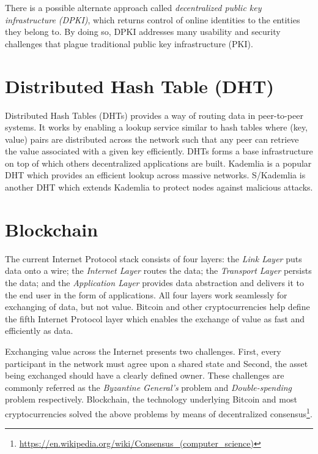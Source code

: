 	There is a possible alternate approach called \textit{decentralized public key infrastructure (DPKI)}, which returns control of online identities to the entities they belong to. By doing so, DPKI addresses many usability and security challenges that plague traditional public key infrastructure (PKI)\cite{allen2015decentralized}.
	
\section{Distributed Hash Table (DHT)}
	Distributed Hash Tables (DHTs)\cite{galuba2009distributed} provides a way of routing data in peer-to-peer systems. It works by enabling a lookup service similar to hash tables where (key, value) pairs are distributed across the network such that any peer can retrieve the value associated with a given key efficiently. DHTs forms a base infrastructure on top of which others decentralized applications are built. Kademlia\cite{maymounkov2002kademlia} is a popular DHT which provides an efficient lookup across massive networks. S/Kademlia\cite{baumgart2007s} is another DHT which extends Kademlia to protect nodes against malicious attacks.

\section{Blockchain}
	The current Internet Protocol stack consists of four layers: the \textit{Link Layer} puts data onto a wire; the \textit{Internet Layer} routes the data; the \textit{Transport Layer} persists the data; and the \textit{Application Layer} provides data abstraction and delivers it to the end user in the form of applications. All four layers work seamlessly for exchanging of data, but not value. Bitcoin\cite{nakamoto2008bitcoin} and other cryptocurrencies help define the fifth Internet Protocol layer which enables the exchange of value as fast and efficiently as data\cite{raval2016decentralized}.
	
	Exchanging value across the Internet presents two challenges. First, every participant in the network must agree upon a shared state and Second, the asset being exchanged should have a clearly defined owner. These challenges are commonly referred as the \textit{Byzantine General's} problem\cite{lamport1982byzantine} and \textit{Double-spending} problem\cite{chohan2017double} respectively. Blockchain, the technology underlying Bitcoin and most cryptocurrencies solved the above problems by means of decentralized consensus\footnote{\url{https://en.wikipedia.org/wiki/Consensus_(computer_science)}}.
	
